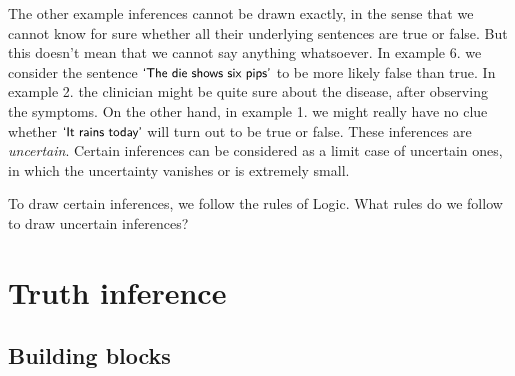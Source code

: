 \documentclass[
  a4paper,
  DIV=11,
  numbers=noendperiod,
  oneside]{scrreprt}
\begin{document}
The other example inferences cannot be drawn exactly, in the sense that
we cannot know for sure whether all their underlying sentences are true
or false. But this doesn't mean that we cannot say anything whatsoever.
In example 6. we consider the sentence
\(\textsf{\small`The die shows six pips'}\) to be more likely false than
true. In example 2. the clinician might be quite sure about the disease,
after observing the symptoms. On the other hand, in example 1. we might
really have no clue whether \(\textsf{\small`It rains today'}\) will
turn out to be true or false. These inferences are \emph{uncertain}.
Certain inferences can be considered as a limit case of uncertain ones,
in which the uncertainty vanishes or is extremely small.

To draw certain inferences, we follow the rules of Logic. What rules do
we follow to draw uncertain inferences?


\hypertarget{sec-truth-inference}{%
\chapter{Truth inference}\label{sec-truth-inference}}

\providecommand{\ul}{\uline}
\renewcommand*{\|}[1][]{\nonscript\:#1\vert\nonscript\:\mathopen{}}
\providecommand*{\pr}[1]{\textsf{\small`#1'}}
\renewcommand*{\pr}[1]{\textsf{\small`#1'}}
\providecommand*{\prq}[1]{\textsf{\small #1}}
\renewcommand*{\prq}[1]{\textsf{\small #1}}
\providecommand{\se}[1]{\mathsfit{#1}}
\renewcommand{\se}[1]{\mathsfit{#1}}
\providecommand{\p}{\mathrm{p}}
\renewcommand{\p}{\mathrm{p}}
\renewcommand{\P}{\mathrm{P}}

\hypertarget{building-blocks}{%
\section{Building blocks}\label{building-blocks}}
\end{document}
